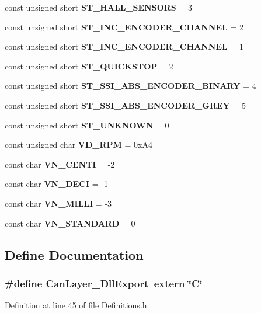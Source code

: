 \begin{DoxyCompactItemize}
\item 
const unsigned short {\bf \-S\-T\-\_\-\-H\-A\-L\-L\-\_\-\-S\-E\-N\-S\-O\-R\-S} = 3
\item 
const unsigned short {\bf \-S\-T\-\_\-\-I\-N\-C\-\_\-\-E\-N\-C\-O\-D\-E\-R\-\_\-C\-H\-A\-N\-N\-E\-L} = 2
\item 
const unsigned short {\bf \-S\-T\-\_\-\-I\-N\-C\-\_\-\-E\-N\-C\-O\-D\-E\-R\-\_\-C\-H\-A\-N\-N\-E\-L} = 1
\item 
const unsigned short {\bf \-S\-T\-\_\-\-Q\-U\-I\-C\-K\-S\-T\-O\-P} = 2
\item 
const unsigned short {\bf \-S\-T\-\_\-\-S\-S\-I\-\_\-\-A\-B\-S\-\_\-\-E\-N\-C\-O\-D\-E\-R\-\_\-\-B\-I\-N\-A\-R\-Y} = 4
\item 
const unsigned short {\bf \-S\-T\-\_\-\-S\-S\-I\-\_\-\-A\-B\-S\-\_\-\-E\-N\-C\-O\-D\-E\-R\-\_\-\-G\-R\-E\-Y} = 5
\item 
const unsigned short {\bf \-S\-T\-\_\-\-U\-N\-K\-N\-O\-W\-N} = 0
\item 
const unsigned char {\bf \-V\-D\-\_\-\-R\-P\-M} = 0x\-A4
\item 
const char {\bf \-V\-N\-\_\-\-C\-E\-N\-T\-I} = -\/2
\item 
const char {\bf \-V\-N\-\_\-\-D\-E\-C\-I} = -\/1
\item 
const char {\bf \-V\-N\-\_\-\-M\-I\-L\-L\-I} = -\/3
\item 
const char {\bf \-V\-N\-\_\-\-S\-T\-A\-N\-D\-A\-R\-D} = 0
\end{DoxyCompactItemize}


\subsection{\-Define \-Documentation}
\subsubsection[{\-Can\-Layer\-\_\-\-Dll\-Export}]{\setlength{\rightskip}{0pt plus 5cm}\#define {\bf \-Can\-Layer\-\_\-\-Dll\-Export}~extern \char`\"{}\-C\char`\"{}}\label{Definitions_8h_af2eaafbe8636298456cc78b40dbad78e}


\-Definition at line 45 of file \-Definitions.\-h.

